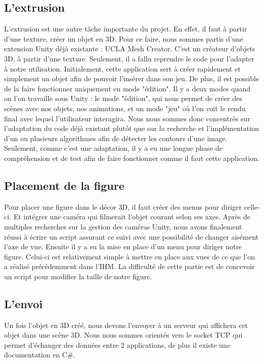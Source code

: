 \documentclass[a4paper,11pt]{article}
\begin{document}
		\hypertarget{ancre}{
		\subsection{L'extrusion}}
		\label{extrusion}
		L'extrusion est une autre tâche importante du projet. En effet, il faut à partir d'une texture, créer un objet en 3D. Pour ce faire, nous sommes partis d'une extension Unity déjà existante : UCLA Mesh Creator. C'est un créateur d'objets 3D, à partir d'une texture. Seulement, il a fallu reprendre le code pour l'adapter à notre utilisation. Initialement, cette application sert à créer rapidement et simplement un objet afin de pouvoir l'insérer dans son jeu. De plus, il est possible de la faire fonctionner uniquement en mode "édition". Il y a deux modes quand on l'on travaille sous Unity : le mode "édition", qui nous permet de créer des scènes avec nos objets, nos animations, et un mode "jeu" où l'on voit le rendu final avec lequel l'utilisateur interagira. Nous nous sommes donc concentrés sur l'adaptation du code déjà existant plutôt que sur la recherche et l'implémentation d'un ou plusieurs algorithmes afin de détecter les contours d'une image. Seulement, comme c'est une adaptation, il y a eu une longue phase de compréhension et de test afin de faire fonctionner comme il faut cette application. 
		\subsection{Placement de la figure}
		
			Pour placer une figure dans le décor 3D, il faut créer des menus pour diriger celle-ci. Et intégrer une caméra qui filmerait l'objet courant selon ses axes. Après de multiples recherches sur la gestion des caméras Unity, nous avons finalement réussi à écrire un script assurant ce suivi avec une possibilité de changer aisément l'axe de vue. Ensuite il y a eu la mise en place d'un menu pour diriger notre figure. Celui-ci est relativement simple à mettre en place aux vues de ce que l'on a réalisé précédemment dans l'IHM. La difficulté de cette partie est de concevoir un script pour modifier la taille de notre figure.

		\subsection{L'envoi}
			Un fois l'objet en 3D créé, nous devons l'envoyer à un serveur qui affichera cet objet dans une scène 3D.
			Nous nous sommes orientés vers le socket TCP qui permet d'échanger des données entre 2 applications, de plus il existe une documentation en C\#.
						
\end{document}
